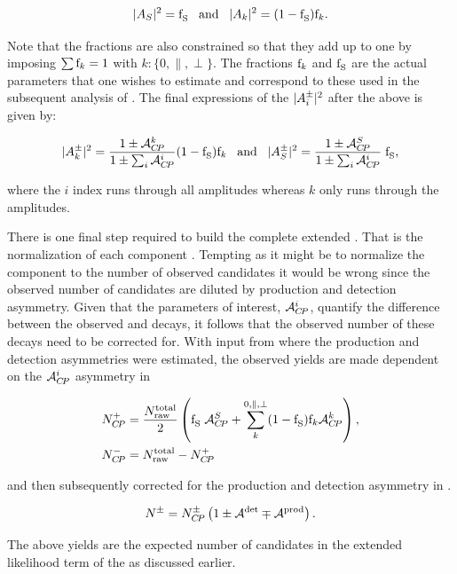 \begin{equation}
|{A}_{S}|^2 = \text{f}_{\text{S}}^{} \;\;\;\text{and}\;\;\; |{A}_{k}|^2 = (1-\text{f}_{\text{S}}^{})\text{f}_{k}.
\label{amps_param}
\end{equation}

\noindent Note that the \pwave fractions are also constrained so that they add up to one by imposing $\sum\text{f}_{k}=1$ with $k:\{0,\parallel,\perp\}$.
The fractions $\text{f}_{k}$ and $\text{f}_{\text{S}}^{}$ are the actual parameters that one wishes to estimate and correspond to these used in the subsequent analysis of
. The final expressions of the $|{A}_{i}^{\pm}|^2$ after the above is given by:

\begin{equation}
|{A}_{k}^{\pm}|^2 = \frac{1\pm\mathcal{A}_{C\!P}^{k}}{1\pm\sum_i\mathcal{A}_{C\!P}^{i}}  (1-\text{f}_{\text{S}}^{})\text{f}_{k}  \;\;\; \text{and}\;\;\; |{A}_{S}^{\pm}|^2 = \frac{1\pm\mathcal{A}_{C\!P}^{S}}{1\pm\sum_i\mathcal{A}_{C\!P}^{i}} \; \text{f}_{\text{S}}^{},
\label{amps_final}
\end{equation}

\noindent where the $i$ index runs through all amplitudes whereas $k$ only runs through the \pwave amplitudes.

There is one final step required to build the complete extended \pdf. That is the normalization of each component \pdf. Tempting as it might be to
normalize the component \pdfs to the number of observed candidates it would be wrong since the observed number of candidates are diluted by production and detection
asymmetry. Given that the parameters of interest, $\mathcal{A}_{C\!P}^{i}$, quantify the difference between the observed \BsbarJpsiKst and \BsJpsiKst decays, it follows that
the observed number of these decays need to be corrected for. With input from  where the production and detection
asymmetries were estimated, the observed yields are made dependent on the $\mathcal{A}_{C\!P}^{i}$ asymmetry in 

\begin{subequations}
  \label{acp_yields}
  \begin{align}
    N^{+}_{C\!P} &= \frac{ N_{\text{raw}}^{\text{total}} }{2} \left( \text{f}_{\text{S}}^{}\; \mathcal{A}_{C\!P}^{S} + \sum_k^{0,\parallel,\perp} (1-\text{f}_{\text{S}}^{})\text{f}_{k}\mathcal{A}_{C\!P}^{k}  \right), \\
    N^{-}_{C\!P} &=  N_{\text{raw}}^{\text{total}} - N^{+}_{C\!P}
  \end{align}
\end{subequations}

\noindent and then subsequently corrected for the production and detection asymmetry in .

\begin{equation}
N^{\pm} = N^{\pm}_{C\!P}  \left( 1 \pm \mathcal{A}^{\text{det}} \mp \mathcal{A}^{\text{prod}} \right).
\label{norm_yields}
\end{equation}

\noindent The above yields are the expected number of candidates in the extended likelihood term of the \pdfs as discussed earlier.
